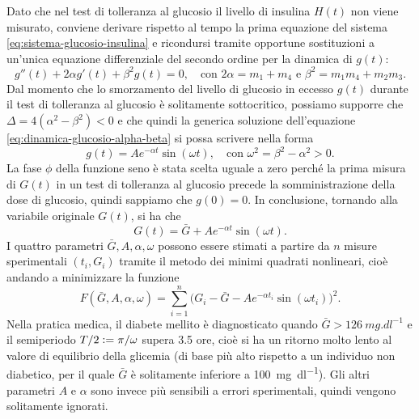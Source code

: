 Dato che nel test di tolleranza al glucosio il livello di insulina $H(t)$
non viene misurato, conviene derivare rispetto al tempo
la prima equazione del sistema \eqref{eq:sistema-glucosio-insulina} e ricondursi
tramite opportune sostituzioni a un'unica equazione differenziale del
secondo ordine per la dinamica di $g(t)$:
\begin{equation} \label{eq:dinamica-glucosio-alpha-beta}
g''(t) + 2 \alpha g'(t) + \beta^2 g(t) = 0,
\quad \text{con $2 \alpha = m_1 + m_4$ e $\beta^2 = m_1 m_4 + m_2 m_3$}.
\end{equation}
Dal momento che lo smorzamento del livello di glucosio in eccesso $g(t)$ durante
il test di tolleranza al glucosio è solitamente sottocritico, possiamo
supporre che $\Delta = 4(\alpha^2-\beta^2) < 0$ e che quindi la generica
soluzione dell'equazione \eqref{eq:dinamica-glucosio-alpha-beta}
si possa scrivere nella forma
\[
g(t) = A e^{-\alpha t} \sin(\omega t),
\quad \text{con $\omega^2 = \beta^2-\alpha^2 > 0$}.
\]
La fase $\phi$ della funzione seno è stata scelta uguale a zero perché
la prima misura di $G(t)$ in un test di tolleranza al glucosio precede
la somministrazione della dose di glucosio, quindi sappiamo
che $g(0) = 0$. In conclusione, tornando alla variabile originale $G(t)$,
si ha che
\[
G(t) = \bar{G} + A e^{-\alpha t} \sin(\omega t).
\]
I quattro parametri $\bar{G},A,\alpha,\omega$ possono essere stimati a partire
da $n$ misure sperimentali $(t_i,G_i)$ tramite il metodo dei minimi quadrati
nonlineari, cioè andando a minimizzare la funzione
\[
F(\bar{G},A,\alpha,\omega) = \sum_{i=1}^n \bigl(
	G_i - \bar{G} - Ae^{-\alpha t_i} \sin(\omega t_i)
\bigr)^2.
\]
Nella pratica medica, il diabete mellito è diagnosticato quando
$\bar{G} > \SI{126}{mg.dl^{-1}}$ e il semiperiodo $T/2 \vcentcolon= \pi/\omega$
supera 3.5 ore, cioè si ha un ritorno molto lento al valore di equilibrio
della glicemia (di base più alto rispetto a un individuo non diabetico,
per il quale $\bar{G}$ è solitamente inferiore a \SI{100}{mg.dl^{-1}}).
Gli altri parametri $A$ e $\alpha$ sono invece più sensibili a errori
sperimentali, quindi vengono solitamente ignorati.

